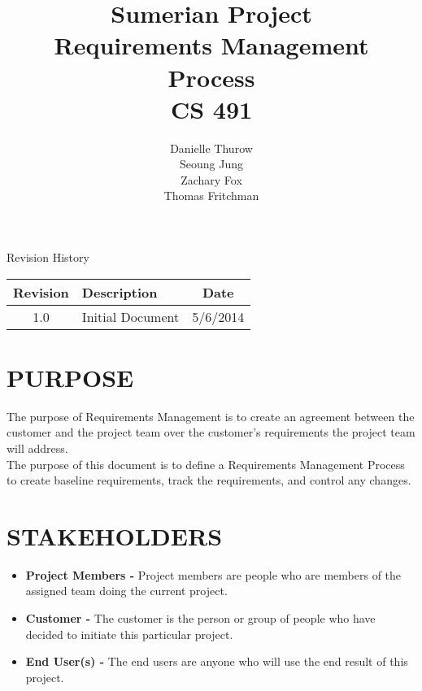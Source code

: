 \documentclass[11pt]{article}
\title{Sumerian Project\\
		Requirements Management Process\\
		CS 491}
\author{Danielle Thurow \\
		  Seoung Jung\\
		  Zachary Fox\\
		  Thomas Fritchman}
\date{}
\begin{document}
\maketitle

\newpage

\tableofcontents

\newpage

\begin{center}

\Large Revision History\\
\begin{tabularx}{\textwidth}{|c|X|c|}
	\hline
	\textbf{Revision} & \textbf{Description} & \textbf{Date}\\ \hline
	1.0 & Initial Document & 5/6/2014\\ \hline
\end{tabularx}


\end{center}

\newpage



\section{PURPOSE} 
The purpose of Requirements Management is to create an agreement between the customer and the project team over the customer's requirements the project team will address.\\
 
The purpose of this document is to define a Requirements Management Process to create baseline requirements, track the requirements, and control any changes.\\

\section{STAKEHOLDERS}  

\begin{itemize}

\item \textbf{Project Members -} Project members are people who are members of the assigned team doing the current project. \\

\item \textbf{Customer -} The customer is the person or group of people who have decided to initiate this particular project.\\

\item \textbf{End User(s) -} The end users are anyone who will use the end result of this project.\\

\end{itemize}
\end{document}
